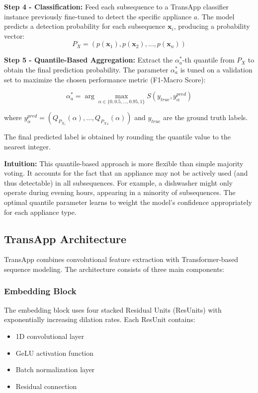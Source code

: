\documentclass[conference]{IEEEtran}
\begin{document}
\textbf{Step 4 - Classification:} Feed each subsequence to a TransApp classifier instance previously fine-tuned to detect the specific appliance $a$. The model predicts a detection probability for each subsequence $\mathbf{x}_i$, producing a probability vector:
\begin{equation}
P_X = (p(\mathbf{x}_1), p(\mathbf{x}_2), \ldots, p(\mathbf{x}_n))
\end{equation}

\textbf{Step 5 - Quantile-Based Aggregation:} Extract the $\alpha_a^*$-th quantile from $P_X$ to obtain the final prediction probability. The parameter $\alpha_a^*$ is tuned on a validation set to maximize the chosen performance metric (F1-Macro Score):

\begin{equation}
\alpha_a^* = \arg\max_{\alpha \in \{0, 0.5, \ldots, 0.95, 1\}} S(y_{true}, y_{\alpha}^{pred})
\end{equation}

where $y_{\alpha}^{pred} = (Q_{P_{X_1}}(\alpha), \ldots, Q_{P_{X_N}}(\alpha))$ and $y_{true}$ are the ground truth labels.

The final predicted label is obtained by rounding the quantile value to the nearest integer.

\textbf{Intuition:} This quantile-based approach is more flexible than simple majority voting. It accounts for the fact that an appliance may not be actively used (and thus detectable) in all subsequences. For example, a dishwasher might only operate during evening hours, appearing in a minority of subsequences. The optimal quantile parameter learns to weight the model's confidence appropriately for each appliance type.

\subsection{TransApp Architecture}

TransApp combines convolutional feature extraction with Transformer-based sequence modeling. The architecture consists of three main components:

\subsubsection{Embedding Block}

The embedding block uses four stacked Residual Units (ResUnits) with exponentially increasing dilation rates. Each ResUnit contains:
\begin{itemize}
    \item 1D convolutional layer
    \item GeLU activation function
    \item Batch normalization layer
    \item Residual connection
\end{itemize}
\end{document}

